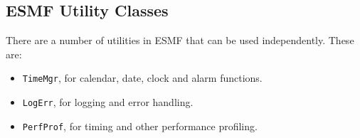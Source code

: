 \subsection{ESMF Utility Classes}

There are a number of utilities in ESMF that can be used independently.
These are:
\begin{itemize}
\item {\tt TimeMgr}, for calendar, date, clock and alarm functions.
\item {\tt LogErr}, for logging and error handling.
\item {\tt PerfProf}, for timing and other performance profiling.
\end{itemize}

